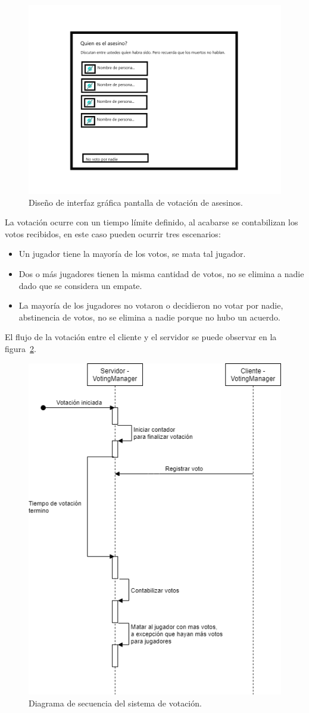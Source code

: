 \begin{figure}[H]
    \centering
    \includegraphics[width=0.5\linewidth]{images/votacion.png}
    \caption{Diseño de interfaz gráfica pantalla de votación de asesinos.}
    \label{fig:diagrama_ui_votacion}
\end{figure}

La votación ocurre con un tiempo límite definido, al acabarse se contabilizan los votos recibidos, en este caso pueden ocurrir tres escenarios:
\begin{itemize}
    \item Un jugador tiene la mayoría de los votos, se mata tal jugador.
    \item Dos o más jugadores tienen la misma cantidad de votos, no se elimina a nadie dado que se considera un empate.
    \item La mayoría de los jugadores no votaron o decidieron no votar por nadie, abstinencia de votos, no se elimina a nadie porque no hubo un acuerdo.
\end{itemize}

El flujo de la votación entre el cliente y el servidor se puede observar en la figura~\ref{fig:diagrama_sec_votacion}.

\begin{figure}[H]
    \centering
    \includegraphics[width=0.5\linewidth]{images/diagrama_secuencia_votos.png}
    \caption{Diagrama de secuencia del sistema de votación.}
    \label{fig:diagrama_sec_votacion}
\end{figure}

